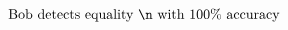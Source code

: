 \documentclass[preview]{standalone}
\begin{document}
\begin{align*}
\text{Bob detects equality \n with }100\% \text{ accuracy}
\end{align*}
\end{document}
